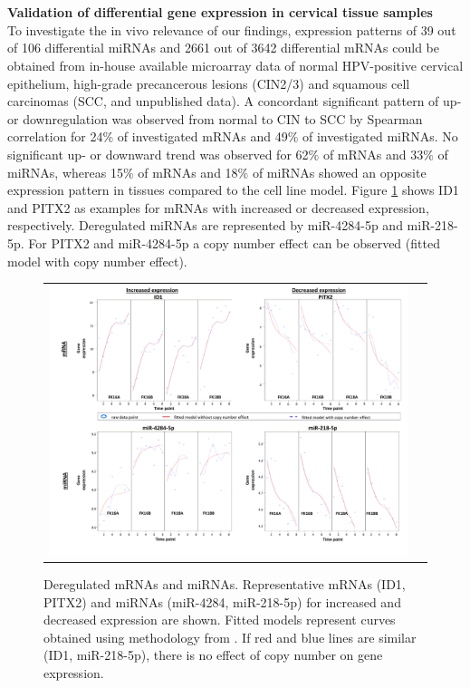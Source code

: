 \\
\\
\textbf{Validation of differential gene expression in cervical tissue samples}
\\
To investigate the in vivo relevance of our findings, expression patterns of 39 out of 106 differential miRNAs and 2661 out of 3642 differential mRNAs could be obtained from in-house available microarray data of normal HPV-positive cervical epithelium, high-grade precancerous lesions (CIN2/3) and squamous cell carcinomas (SCC, \cite{Wilting2013} and unpublished data). A concordant significant pattern of up- or downregulation was observed from normal to CIN to SCC by Spearman correlation for 24$\%$ of investigated mRNAs and 49$\%$ of investigated miRNAs. No significant up- or downward trend was observed for 62$\%$ of mRNAs and 33$\%$ of miRNAs, whereas 15$\%$ of mRNAs and 18$\%$ of miRNAs showed an opposite expression pattern in tissues compared to the cell line model.
Figure \ref{fig:figure55} shows ID1 and PITX2 as examples for mRNAs with increased or decreased expression, respectively. Deregulated miRNAs are represented by miR-4284-5p and miR-218-5p. For PITX2 and miR-4284-5p a copy number effect can be observed (fitted model with copy number effect).
\begin{figure}[h!]
\centering
\begin{tabular}{cc} 
\includegraphics[scale=0.6]{Figure5.pdf}
\end{tabular}
\caption{Deregulated mRNAs and miRNAs. Representative mRNAs (ID1, PITX2) and miRNAs (miR-4284, miR-218-5p) for increased and decreased expression are shown. Fitted models represent curves obtained using methodology from \cite{Miok2014}. If red and blue lines are similar (ID1, miR-218-5p), there is no effect of copy number on gene expression.
}
\label{fig:figure55}
\end{figure}
